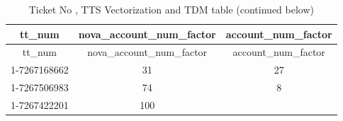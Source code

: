 \documentclass[]{article}
\begin{document}
\begin{longtable}[c]{@{}ccc@{}}
\caption{Ticket No , TTS Vectorization and TDM table (continued
below)}\tabularnewline
\toprule
\begin{minipage}[b]{0.16\columnwidth}\centering\strut
tt\_num
\strut\end{minipage} &
\begin{minipage}[b]{0.33\columnwidth}\centering\strut
nova\_account\_num\_factor
\strut\end{minipage} &
\begin{minipage}[b]{0.25\columnwidth}\centering\strut
account\_num\_factor
\strut\end{minipage}\tabularnewline
\midrule
\endfirsthead
\toprule
\begin{minipage}[b]{0.16\columnwidth}\centering\strut
tt\_num
\strut\end{minipage} &
\begin{minipage}[b]{0.33\columnwidth}\centering\strut
nova\_account\_num\_factor
\strut\end{minipage} &
\begin{minipage}[b]{0.25\columnwidth}\centering\strut
account\_num\_factor
\strut\end{minipage}\tabularnewline
\midrule
\endhead
\begin{minipage}[t]{0.16\columnwidth}\centering\strut
1-7267168662
\strut\end{minipage} &
\begin{minipage}[t]{0.33\columnwidth}\centering\strut
31
\strut\end{minipage} &
\begin{minipage}[t]{0.25\columnwidth}\centering\strut
27
\strut\end{minipage}\tabularnewline
\begin{minipage}[t]{0.16\columnwidth}\centering\strut
1-7267506983
\strut\end{minipage} &
\begin{minipage}[t]{0.33\columnwidth}\centering\strut
74
\strut\end{minipage} &
\begin{minipage}[t]{0.25\columnwidth}\centering\strut
8
\strut\end{minipage}\tabularnewline
\begin{minipage}[t]{0.16\columnwidth}\centering\strut
1-7267422201
\strut\end{minipage} &
\begin{minipage}[t]{0.33\columnwidth}\centering\strut
100
\strut\end{minipage} &

\end{longtable}
\end{document}
